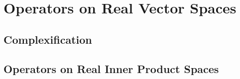 \chapter{Operators on Real Vector Spaces}

\section{\label{9.A} Complexification}

\section{\label{9.B} Operators on Real Inner Product Spaces}
